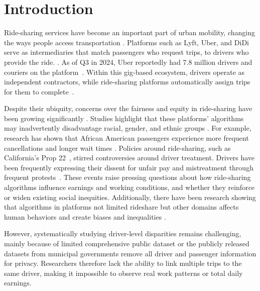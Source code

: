 \section{Introduction}

Ride-sharing services have become an important part of urban mobility, changing the ways people access transportation \cite{RAYLE2016168, RePEc:kap:transp:v:46:y:2019:i:6:d:10.1007_s11116-018-9923-2, NBERw22083}. Platforms such as Lyft, Uber, and DiDi serve as intermediaries that match passengers who request trips, to drivers who provide the ride. \cite{liu2023economic, banerjee2015pricing}. As of Q3 in 2024, Uber reportedly had 7.8 million drivers and couriers on the platform~\cite{uber_financials_2023}. 
Within this gig-based ecosystem, drivers operate as independent contractors, while ride-sharing platforms automatically assign trips for them to complete~\cite{de2024ridesourcing, cram2022examining, duggan2023algorithmic}. 

Despite their ubiquity, concerns over the fairness and equity in ride-sharing have been growing significantly \cite{liu2024evaluating, kumar2023using}. Studies highlight that these platforms' algorithms may inadvertently disadvantage racial, gender, and ethnic groups \cite{rovatsos2019landscape, nanda2020balancing}. For example, research has shown that African American passengers experience more frequent cancellations and longer wait times \cite{GE2020104205}. Policies around ride-sharing, such as California's Prop 22~\cite{california_prop22_2020}, stirred controversies around driver treatment. Drivers have been frequently expressing their dissent for unfair pay and mistreatment through frequent protests~\cite{bk_rideshare_2024, truthout_rideshare_2024}. These events raise pressing questions about how ride-sharing algorithms influence earnings and working conditions, and whether they reinforce or widen existing social inequities. Additionally, there have been research showing that algorithms in platforms not limited rideshare but other domains affects human behaviors and create biases and inequalities \cite{barocas2016big, rosenblat2016algorithmic, rosenblat2018uberland}.


However, systematically studying driver-level disparities remains challenging, mainly because of limited comprehensive public dataset \cite{chan2012ridesharing, allon2023impact} or the publicly released datasets from municipal governments \cite{chicago_tnp_2018, chicago_tnp_2023} remove all driver and passenger information for privacy. Researchers therefore lack the ability to link multiple trips to the same driver, making it impossible to observe real work patterns or total daily earnings.

